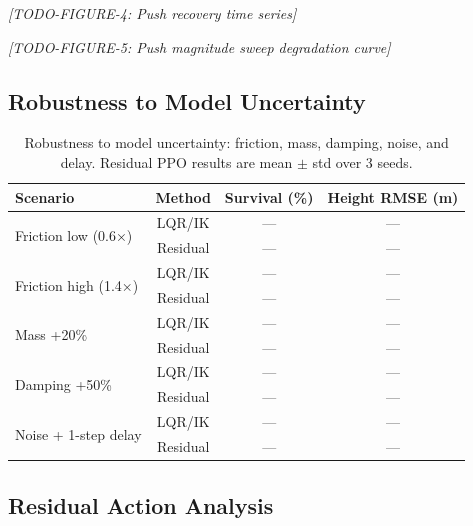 \documentclass[conference]{IEEEtran}
\newcommand{\tbd}{---}
\begin{document}
\textit{[TODO-FIGURE-4: Push recovery time series]}

\textit{[TODO-FIGURE-5: Push magnitude sweep degradation curve]}

\subsection{Robustness to Model Uncertainty}

\begin{table}[ht]
\centering
\caption{Robustness to model uncertainty: friction, mass, damping, noise, and delay.
Residual PPO results are mean $\pm$ std over 3 seeds.}
\label{tab:robustness}
\begin{tabular}{lccc}
\toprule
Scenario & Method & Survival (\%) & Height RMSE (m) \\
\midrule
\multirow{2}{*}{Friction low (0.6×)} & LQR/IK & \tbd & \tbd \\
                                      & Residual & \tbd & \tbd \\
\midrule
\multirow{2}{*}{Friction high (1.4×)} & LQR/IK & \tbd & \tbd \\
                                       & Residual & \tbd & \tbd \\
\midrule
\multirow{2}{*}{Mass +20\%} & LQR/IK & \tbd & \tbd \\
                            & Residual & \tbd & \tbd \\
\midrule
\multirow{2}{*}{Damping +50\%} & LQR/IK & \tbd & \tbd \\
                               & Residual & \tbd & \tbd \\
\midrule
\multirow{2}{*}{Noise + 1-step delay} & LQR/IK & \tbd & \tbd \\
                                      & Residual & \tbd & \tbd \\
\bottomrule
\end{tabular}
\end{table}

\subsection{Residual Action Analysis}
\label{sec:residual_analysis}
\end{document}
